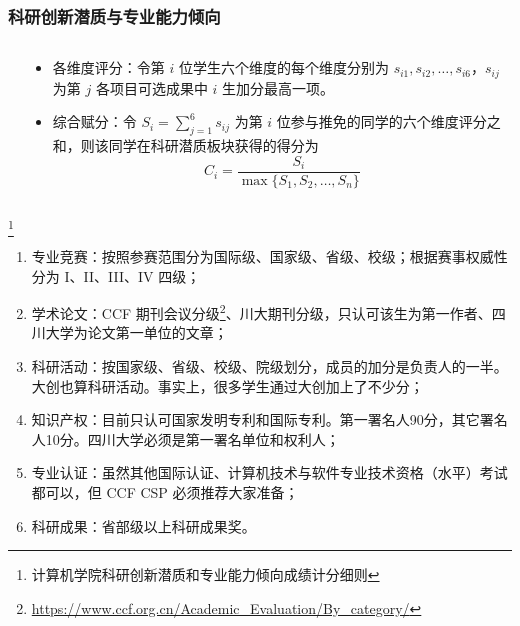 \begin{frame}
	\frametitle{科研创新潜质与专业能力倾向}
	\begin{columns}
		\begin{column}{0.5\linewidth}
			\begin{center}
			\end{center}
		\end{column}
		\begin{column}{0.5\linewidth}
			\begin{itemize}
				\item 各维度评分：令第 $i$ 位学生六个维度的每个维度分别为 $s_{i1}, s_{i2}, \ldots, s_{i6}$，$s_{ij}$ 为第 $j$ 各项目可选成果中 $i$ 生加分最高一项。
				\item 综合赋分：令 $S_i = \sum_{j=1}^6 s_{ij}$ 为第 $i$ 位参与推免的同学的六个维度评分之和，则该同学在科研潜质板块获得的得分为
				      \begin{equation}
					      C_i = \frac{S_i}{\max\{S_1, S_2, \ldots, S_n\}}
				      \end{equation}
			\end{itemize}
		\end{column}
	\end{columns}

	\footnote{计算机学院科研创新潜质和专业能力倾向成绩计分细则}
\end{frame}

\begin{frame}
	\begin{enumerate}
		\item 专业竞赛：按照参赛范围分为国际级、国家级、省级、校级；根据赛事权威性分为 I、II、III、IV 四级；
		\item 学术论文：{CCF 期刊会议分级}\footnote{\url{https://www.ccf.org.cn/Academic\_Evaluation/By\_category/}}、川大期刊分级，只认可该生为第一作者、四川大学为论文第一单位的文章；
		\item 科研活动：按国家级、省级、校级、院级划分，成员的加分是负责人的一半。大创也算科研活动。事实上，很多学生通过大创加上了不少分；
		\item 知识产权：目前只认可国家发明专利和国际专利。第一署名人90分，其它署名人10分。四川大学必须是第一署名单位和权利人；
		\item 专业认证：虽然其他国际认证、计算机技术与软件专业技术资格（水平）考试都可以，但 CCF CSP 必须推荐大家准备；
		\item 科研成果：省部级以上科研成果奖。%
	\end{enumerate}
\end{frame}


